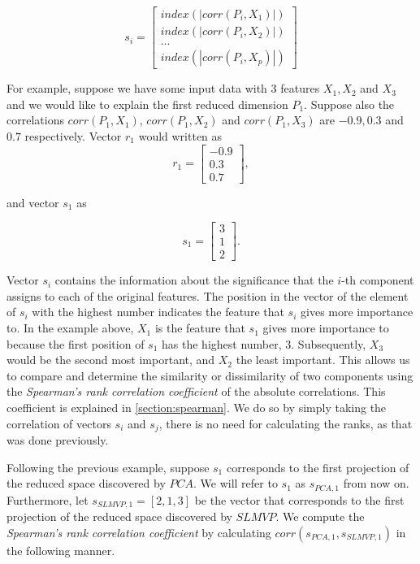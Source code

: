 $$
    s_i =
    \begin{bmatrix}
        index(|corr(P_i, X_1)|) \\
        index(|corr(P_i, X_2)|) \\
        ...                     \\
        index(|corr(P_i, X_p)|)
    \end{bmatrix}
$$

For example, suppose we have some input data with 3 features $X_1, X_2$ and $X_3$ and we would like to explain the first reduced dimension $P_1$. Suppose also the correlations $corr(P_1, X_1)$, $corr(P_1, X_2)$ and $corr(P_1, X_3)$ are $-0.9, 0.3$ and $0.7$ respectively. Vector $r_1$ would written as
$$
    r_1 =
    \begin{bmatrix}
        -0.9 \\
        0.3  \\
        0.7
    \end{bmatrix},
$$

and vector $s_1$ as

$$
    s_1 =
    \begin{bmatrix}
        3 \\
        1 \\
        2
    \end{bmatrix}.
$$

Vector $s_i$ contains the information about the significance that the $i$-th component assigns to each of the original features. The position in the vector of the element of $s_i$ with the highest number indicates the feature that $s_i$ gives more importance to. In the example above, $X_1$ is the feature that $s_1$ gives more importance to because the first position of $s_1$ has the highest number, $3$. Subsequently, $X_3$ would be the second most important, and $X_2$ the least important. This allows us to compare and determine the similarity or dissimilarity of two components using the \textit{Spearman's rank correlation coefficient} of the absolute correlations. This coefficient is explained in \ref{section:spearman}. We do so by simply taking the correlation of vectors $s_i$ and $s_j$, there is no need for calculating the ranks, as that was done previously.

Following the previous example, suppose $s_1$ corresponds to the first projection of the reduced space discovered by $PCA$. We will refer to $s_1$ as $s_{PCA,1}$ from now on. Furthermore, let $s_{SLMVP,1} = [ 2, 1, 3 ]$ be the vector that corresponds to the first projection of the reduced space discovered by $SLMVP$. We compute the \textit{Spearman's rank correlation coefficient} by calculating $corr(s_{PCA,1}, s_{SLMVP,1})$ in the following manner.


